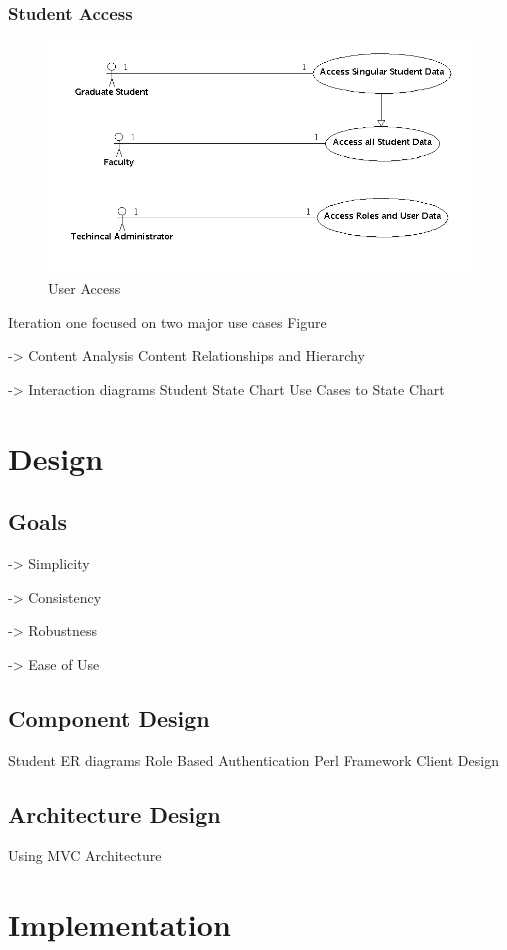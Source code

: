 \documentclass[11pt,a4paper]{report}
\begin{document}
\subsubsection{Student Access}
\begin{figure}[htp]
\centering
\includegraphics[scale=0.5]{diagrams/use_cases/access_uc.png}
\caption{User Access}
\label{fig:UserAccess}
\end{figure}


Iteration one focused on two major use cases Figure 

-> Content Analysis 
Content Relationships and Hierarchy 

-> Interaction diagrams
	Student State Chart 
	Use Cases to State Chart 

\section{Design}
\subsection{Goals}

-> Simplicity

-> Consistency

-> Robustness

-> Ease of Use

\subsection{Component Design}
Student ER diagrams
Role Based Authentication
Perl Framework 
Client Design 
\subsection{Architecture Design}
Using MVC Architecture 
\section{Implementation}
\end{document}
